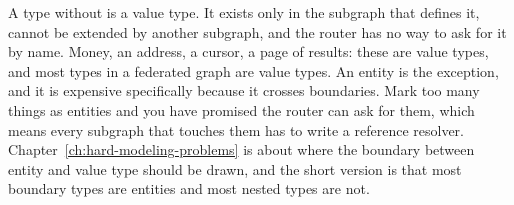 %
A type without  is a value type. It exists only in the subgraph that
defines it, cannot be extended by another subgraph, and the router has no way to
ask for it by name. Money, an address, a cursor, a page of results: these are
value types, and most types in a federated graph are value types. An entity is
the exception, and it is expensive specifically because it crosses boundaries.
Mark too many things as entities and you have promised the router can ask for
them, which means every subgraph that touches them has to write a reference
resolver. Chapter~\ref{ch:hard-modeling-problems} is about where the boundary
between entity and value type should be drawn, and the short version is that
most boundary types are entities and most nested types are not.

%
